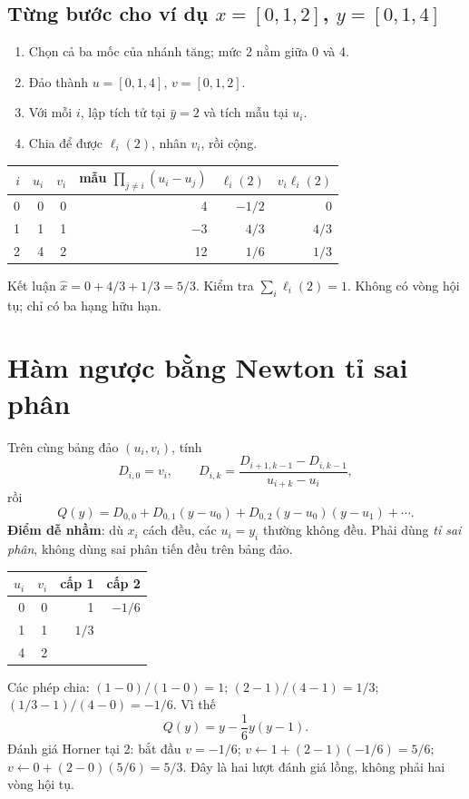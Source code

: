 \subsection{Từng bước cho ví dụ $x=[0,1,2]$, $y=[0,1,4]$}
\begin{enumerate}
\item Chọn cả ba mốc của nhánh tăng; mức 2 nằm giữa 0 và 4.
\item Đảo thành $u=[0,1,4]$, $v=[0,1,2]$.
\item Với mỗi $i$, lập tích tử tại $\bar y=2$ và tích mẫu tại $u_i$.
\item Chia để được $\ell_i(2)$, nhân $v_i$, rồi cộng.
\end{enumerate}
\begin{center}\small
\begin{tabular}{@{}rrrrrr@{}}\toprule
$i$ & $u_i$ & $v_i$ & mẫu $\prod_{j\ne i}(u_i-u_j)$ & $\ell_i(2)$ & $v_i\ell_i(2)$\\\midrule
0 & 0 & 0 & 4 & $-1/2$ & 0\\
1 & 1 & 1 & $-3$ & $4/3$ & $4/3$\\
2 & 4 & 2 & 12 & $1/6$ & $1/3$\\\bottomrule
\end{tabular}\end{center}
Kết luận $\widehat x=0+4/3+1/3=5/3$. Kiểm tra $\sum_i\ell_i(2)=1$. Không có vòng hội tụ; chỉ có ba hạng hữu hạn.

\section{Hàm ngược bằng Newton tỉ sai phân}
\label{sec:inverse-newton}
Trên cùng bảng đảo $(u_i,v_i)$, tính
\[
 D_{i,0}=v_i,\qquad D_{i,k}=\frac{D_{i+1,k-1}-D_{i,k-1}}{u_{i+k}-u_i},
\]
rồi
\[
 Q(y)=D_{0,0}+D_{0,1}(y-u_0)+D_{0,2}(y-u_0)(y-u_1)+\cdots.
\]
\textbf{Điểm dễ nhầm}: dù $x_i$ cách đều, các $u_i=y_i$ thường không đều. Phải dùng \emph{tỉ sai phân}, không dùng sai phân tiến đều trên bảng đảo.

\begin{center}\begin{tabular}{@{}rrrr@{}}\toprule
$u_i$ & $v_i$ & cấp 1 & cấp 2\\\midrule
0 & 0 & 1 & $-1/6$\\
1 & 1 & $1/3$ & \\
4 & 2 & & \\\bottomrule
\end{tabular}\end{center}
Các phép chia: $(1-0)/(1-0)=1$; $(2-1)/(4-1)=1/3$; $(1/3-1)/(4-0)=-1/6$. Vì thế
\[
 Q(y)=y-\frac16y(y-1).
\]
Đánh giá Horner tại 2: bắt đầu $v=-1/6$; $v\leftarrow1+(2-1)(-1/6)=5/6$; $v\leftarrow0+(2-0)(5/6)=5/3$. Đây là hai lượt đánh giá lồng, không phải hai vòng hội tụ.

